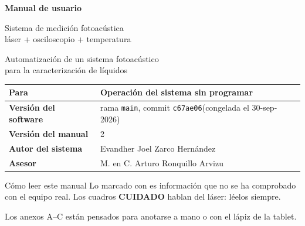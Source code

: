 \documentclass[11pt]{article}
\newcommand{\sv}[1]{\svbox{#1}}
\newcommand{\cod}[1]{\texttt{#1}}
\begin{document}
\begin{titlepage}
\pagestyle{empty}
\thispagestyle{empty}
\centering
\vspace*{8mm}
{\fontsize{24}{28}\selectfont\bfseries\color{acc}Manual de usuario\par}
\vspace{4mm}
{\large\color{mute}Sistema de medición fotoacústica\\láser + osciloscopio + temperatura\par}
\vspace{8mm}
Automatización de un sistema fotoacústico\\para la caracterización de líquidos\par
\vspace{8mm}
{\small\renewcommand{\arraystretch}{1.3}
\begin{tabularx}{0.86\linewidth}{>{\bfseries}L{2.7cm}Y}
\toprule
Para & Operación del sistema sin programar\\
\midrule
Versión del software & rama \cod{main}, commit \cod{c67ae06}\newline(congelada el 30-sep-2026)\\
\midrule
Versión del manual & 2\\
\midrule
Autor del sistema & Evandher Joel Zarco Hernández\\
\midrule
Asesor & M. en C. Arturo Ronquillo Arvizu\\
\bottomrule
\end{tabularx}\par}
\vspace{5mm}
\raggedright
\begin{advertencia}{Cómo leer este manual}
Lo marcado con \sv{sin verificar} es información que no se ha comprobado con el equipo real. Los cuadros \textbf{CUIDADO} hablan del láser: léelos siempre.
\end{advertencia}
\end{titlepage}

\setcounter{page}{2}
\hypersetup{linkcolor=ink}
\tableofcontents
\hypersetup{linkcolor=acc}
\vspace{2mm}
{\small\color{mute}Los anexos A--C están pensados para anotarse a mano o con el lápiz de la tablet.\par}

\clearpage
\end{document}
